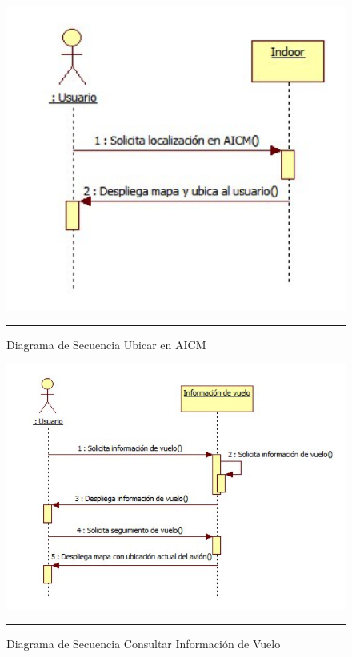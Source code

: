 \begin{figure}[H]
	\centering
		\includegraphics[width=1\textwidth]{Figuras/secUbicarAICM.png}
		\rule{30em}{0.5pt}
	\caption[Diagrama de Secuencia Ubicar en AICM]{Diagrama de Secuencia Ubicar en AICM}
	\label{fig:secUbicarAICM}
\end{figure}

\begin{figure}[H]
	\centering
		\includegraphics[width=1\textwidth]{Figuras/secConsultarInformacionVuelo.png}
		\rule{30em}{0.5pt}
	\caption[Diagrama de Secuencia Consultar Información de Vuelo]{Diagrama de Secuencia Consultar Información de Vuelo}
	\label{fig:secConsultarInformacionVuelo}
\end{figure}